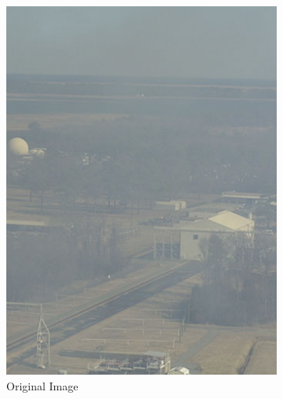 \documentclass[12pt, a4paper, font = Times New Roman]{article}
\begin{document}
\begin{figure}[!h]
  \begin{subfigure}[b]{0.3\textwidth}
    \includegraphics[width=\textwidth]{avs.jpg}
    \caption{Original Image}
    \label{fig:misty}
  \end{subfigure}
  \begin{subfigure}[b]{0.3\textwidth}

\end{subfigure}
\end{figure}
\end{document}
